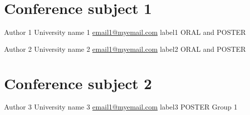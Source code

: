 \documentclass{sccs}
\begin{document}


 \normalsize

 \cleardoublepage
\section{Conference subject 1}
 \clearpage

\label{sec:sec1}


%
{Author 1}%
{University name 1}%
{\href{mailto:email1@myemail.com}{email1@myemail.com}}%
{\lipsum[2]}%
{label1}%
{ORAL and POSTER}%

%
{Author 2}%
{University name 2}%
{\href{mailto:email2@myemail.com}{email1@myemail.com}}%
{\lipsum[2]}%
{label2}%
{ORAL and POSTER}%



 \cleardoublepage
\section{Conference subject 2}
 \clearpage

\label{sec:sec2}


%
{Author 3}%
{University name 3}%
{\href{mailto:email3@myemail.com}{email1@myemail.com}}%
{\lipsum[2]}%
{label3}%
{POSTER Group 1}%


\end{document}
